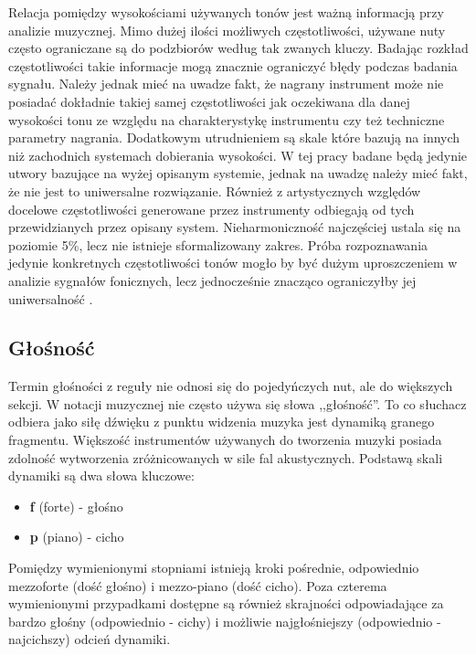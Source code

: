 \documentclass[12pt,a4paper,twoside]{mwart}
\begin{document}
Relacja pomiędzy wysokościami używanych tonów jest ważną informacją przy analizie muzycznej. Mimo dużej ilości możliwych częstotliwości, używane nuty często ograniczane są do podzbiorów według tak zwanych kluczy. Badając rozkład częstotliwości takie informacje mogą znacznie ograniczyć błędy podczas badania sygnału. Należy jednak mieć na uwadze fakt, że nagrany instrument może nie posiadać dokładnie takiej samej częstotliwości jak oczekiwana dla danej wysokości tonu ze względu na charakterystykę instrumentu czy też techniczne parametry nagrania. Dodatkowym utrudnieniem są skale które bazują na innych niż zachodnich systemach dobierania wysokości. W tej pracy badane będą jedynie utwory bazujące na wyżej opisanym systemie, jednak na uwadzę należy mieć fakt, że nie jest to uniwersalne rozwiązanie. Również z artystycznych względów docelowe częstotliwości generowane przez instrumenty odbiegają od tych przewidzianych przez opisany system. Nieharmoniczność najczęściej ustala się na poziomie 5\%, lecz nie istnieje sformalizowany zakres. Próba rozpoznawania jedynie konkretnych częstotliwości tonów mogło by być dużym uproszczeniem w analizie sygnałów fonicznych, lecz jednocześnie znacząco ograniczyłby jej uniwersalność \cite[64-65]{Homerecording:DlaKazdego} \cite[7-11]{Transcription:Anssi:SignalProcessingMethods}.

\subsection{Głośność} \label{sec:loudness}
Termin głośności z reguły nie odnosi się do pojedyńczych nut, ale do większych sekcji. W notacji muzycznej nie często używa się słowa ,,głośność''. To co słuchacz odbiera jako siłę dźwięku z punktu widzenia muzyka jest dynamiką granego fragmentu. Większość instrumentów używanych do tworzenia muzyki posiada zdolność wytworzenia zróżnicowanych w sile fal akustycznych. Podstawą skali dynamiki są dwa słowa kluczowe:

\begin{itemize}
  \item \textbf{f} (forte) - głośno
  \item \textbf{p} (piano) - cicho
\end{itemize}

Pomiędzy wymienionymi stopniami istnieją kroki pośrednie, odpowiednio mezzo\-forte (dość głośno) i mezzo-piano (dość cicho). Poza czterema wymienionymi przypadkami dostępne są również skrajności odpowiadające za bardzo głośny (odpowiednio - cichy) i możliwie najgłośniejszy (odpowiednio - najcichszy) odcień dynamiki.
\end{document}
